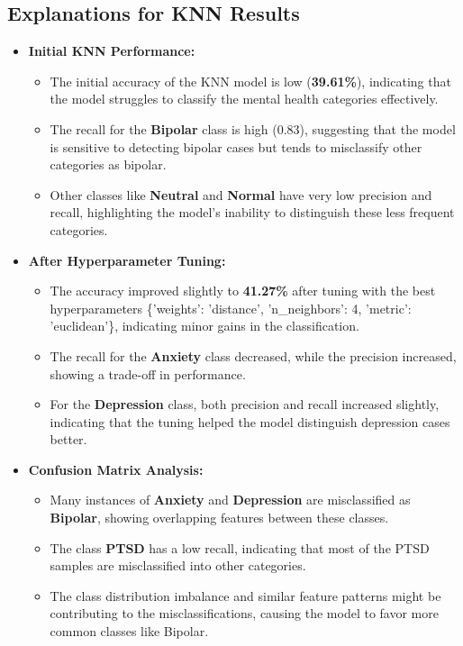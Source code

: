 \subsection{Explanations for KNN Results}

\begin{itemize}
    \item \textbf{Initial KNN Performance:}
    \begin{itemize}
        \item The initial accuracy of the KNN model is low (\textbf{39.61\%}), indicating that the model struggles to classify the mental health categories effectively.
        \item The recall for the \textbf{Bipolar} class is high (0.83), suggesting that the model is sensitive to detecting bipolar cases but tends to misclassify other categories as bipolar.
        \item Other classes like \textbf{Neutral} and \textbf{Normal} have very low precision and recall, highlighting the model’s inability to distinguish these less frequent categories.
    \end{itemize}

    \item \textbf{After Hyperparameter Tuning:}
    \begin{itemize}
        \item The accuracy improved slightly to \textbf{41.27\%} after tuning with the best hyperparameters \{'weights': 'distance', 'n\_neighbors': 4, 'metric': 'euclidean'\}, indicating minor gains in the classification.
        \item The recall for the \textbf{Anxiety} class decreased, while the precision increased, showing a trade-off in performance.
        \item For the \textbf{Depression} class, both precision and recall increased slightly, indicating that the tuning helped the model distinguish depression cases better.
    \end{itemize}

    \item \textbf{Confusion Matrix Analysis:}
    \begin{itemize}
        \item Many instances of \textbf{Anxiety} and \textbf{Depression} are misclassified as \textbf{Bipolar}, showing overlapping features between these classes.
        \item The class \textbf{PTSD} has a low recall, indicating that most of the PTSD samples are misclassified into other categories.
        \item The class distribution imbalance and similar feature patterns might be contributing to the misclassifications, causing the model to favor more common classes like Bipolar.
    \end{itemize}
\end{itemize}


